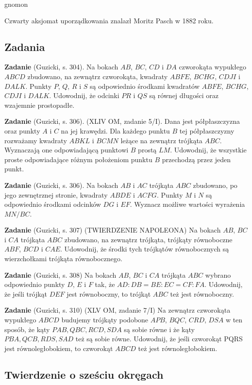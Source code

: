 gnomon %

Czwarty aksjomat uporządkowania znalazł Moritz Pasch \cite{pasch_1882} w 1882 roku.

\subsection{Zadania}
\textbf{Zadanie} (Guzicki, s. 304).
Na bokach $AB$, $BC$, $CD$ i $DA$ czworokąta wypukłego $ABCD$ zbudowano, na zewnątrz czworokąta, kwadraty $ABFE$, $BCHG$, $CDJI$ i $DALK$.
Punkty $P$, $Q$, $R$ i $S$ są odpowiednio środkami kwadratów $ABFE$, $BCHG$, $CDJI$ i $DALK$.
Udowodnij, że odcinki $PR$ i $QS$ są równej długości oraz wzajemnie prostopadłe.

\textbf{Zadanie} (Guzicki, s. 306).
(XLIV OM, zadanie 5/I).
Dana jest półpłaszczyzna oraz punkty $A$ i $C$ na jej krawędzi.
Dla każdego punktu $B$ tej półpłaszczyzny rozważamy kwadraty $ABKL$ i $BCMN$ leżące na zewnątrz trójkąta $ABC$.
Wyznaczają one odpowiadającą punktowi $B$ prostą $LM$.
Udowodnij, że wszystkie proste odpowiadające różnym położeniom punktu $B$ przechodzą przez jeden punkt.

\textbf{Zadanie} (Guzicki, s. 306).
Na bokach $AB$ i $AC$ trójkąta $ABC$ zbudowano, po jego zewnętrznej stronie, kwadraty $ABDE$ i $ACFG$.
Punkty $M$ i $N$ są odpowiednio środkami odcinków $DG$ i $EF$.
Wyznacz możliwe wartości wyrażenia $MN / BC$.

\textbf{Zadanie} (Guzicki, s. 307)
(TWIERDZENIE NAPOLEONA)
Na bokach $AB$, $BC$ i $CA$ trójkąta $ABC$ zbudowano, na zewnątrz trójkąta, trójkąty równoboczne $ABF$, $BCD$ i $CAE$.
Udowodnij, że środki tych trójkątów równobocznych są wierzchołkami trójkąta równobocznego.

\textbf{Zadanie} (Guzicki, s. 308)
Na bokach $AB$, $BC$ i $CA$ trójkąta $ABC$ wybrano odpowiednio punkty $D$, $E$ i $F$ tak, że $AD : DB = BE : EC = CF : FA$.
Udowodnij, że jeśli trójkąt $DEF$ jest równoboczny, to trójkąt $ABC$ też jest równoboczny.

\textbf{Zadanie} (Guzicki, s. 310)
(XLV OM, zadanie 7/I)
Na zewnątrz czworokąta wypukłego $ABCD$ budujemy trójkąty podobone $APB$, $BQC$, $CRD$, $DSA$ w ten sposób, że kąty $PAB, QBC, RCD, SDA$ są sobie równe i że kąty $PBA, QCB, RDS, SAD$ też są sobie równe.
Udowodnij, że jeśli czworokąt PQRS jest równoległobokiem, to czworokąt $ABCD$ też jest równoległobokiem.

%
\subsection{Twierdzenie o sześciu okręgach}

